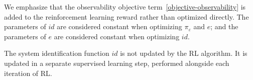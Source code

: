\documentclass{article}
\newcommand{\E}{\mathbb{E}}
\newcommand{\TODO}[1]{\textcolor{red}{\textbf{TODO: #1}}}
\newcommand{\cH}{\mathcal{H}}
\newcommand{\embedfn}{e}
\newcommand{\idfn}{id}
\newcommand{\idset}{\mathcal{D}}
\newcommand{\idvar}{d}
\newcommand{\latvar}{\varepsilon}
\begin{document}
We emphasize that the observability objective term~\eqref{objective-observability}
is added to the reinforcement learning reward rather than optimized directly.
The parameters of $\idfn$ are considered constant when optimizing $\pi_\latvar$ and $e$;
and the parameters of $\embedfn$ are considered constant when optimizing $\idfn$.

The system identification function $\idfn$ is not updated by the RL algorithm.
It is updated in a separate supervised learning step, performed alongside each iteration of RL.

\end{document}
